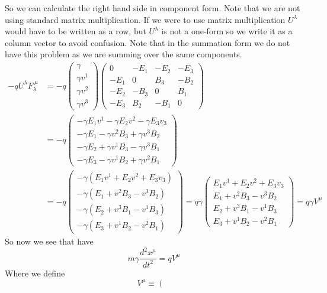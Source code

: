 \documentclass[11pt]{article}
\numberwithin{equation}{section}
\begin{document}
\begin{enumerate}[(a)]
So we can calculate the right hand side in component form. Note that we are not using standard matrix multiplication. If we were to use matrix multiplication $U^{\lambda}$ would have to be written as a row, but $U^{\lambda}$ is not a one-form so we write it as a column vector to avoid confusion. Note that in the summation form we do not have this problem as we are summing over the same components.
\begin{align*}
-qU^{\lambda}F_{\lambda}^{\ \mu} &=
		-q\left(\begin{array}{c}
		\gamma\\	\gamma v^1\\	\gamma v^2\\	\gamma v^3
		\end{array}\right)
		\left(\begin{array}{cccc}
		0 &-E_1 &-E_2 &-E_3\\
		-E_1 &0 &B_3 &-B_2\\
		-E_2 &-B_3 &0 &B_1\\
		-E_3 &B_2 &-B_1 &0
		\end{array}\right)\\
&=		-q\left(\begin{array}{c}
		-\gamma E_1v^1 - \gamma E_2v^2 - \gamma E_3v_3\\	
		-\gamma E_1 - \gamma v^2B_3 + \gamma v^3B_2\\
		-\gamma E_2 + \gamma v^1B_3 - \gamma v^3B_1\\
		-\gamma E_3 - \gamma v^1B_2 + \gamma v^2B_1
		\end{array}\right)\\
&=		-q\left(\begin{array}{c}
		-\gamma (E_1v^1 + E_2v^2 + E_3v_3)\\	
		-\gamma (E_1 + v^2B_3 - v^3B_2)\\
		-\gamma (E_2 + v^3B_1 - v^1B_3)\\
		-\gamma (E_3 + v^1B_2 - v^2B_1)
		\end{array}\right)
=		q\gamma\left(\begin{array}{c}
		E_1v^1 + E_2v^2 + E_3v_3\\	
		E_1 + v^2B_3 - v^3B_2\\
		E_2 + v^3B_1 - v^1B_3\\
		E_3 + v^1B_2 - v^2B_1
		\end{array}\right)
= q\gamma V^{\mu}
\end{align*}
So now we see that have
$$m\gamma\frac{d^2x^{\mu}}{dt^2} = q V^{\mu}$$
Where we define
$$V^{\mu}\equiv \left(\begin{array}{c}

\end{array}$$
\end{enumerate}
\end{document}

